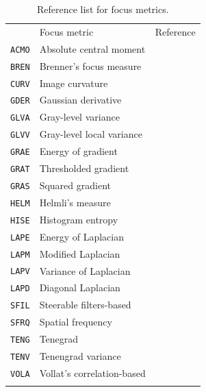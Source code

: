 \begin{table}[!tbh]
    \centering
    \caption{Reference list for focus metrics.}
    \label{tab:A.1_focus_measures}
    \begin{tabular}{@{}llr@{}}
    \toprule
    & Focus metric & Reference \\
    \arrayrulecolor{black!30}\midrule
    \texttt{ACMO} & Absolute central moment & \cite{shirvaikar2004optimal} \\
    \texttt{BREN} & Brenner's focus measure & \cite{santos1997evaluation} \\
    \texttt{CURV} & Image curvature & \cite{helmli2001adaptive} \\
    \texttt{GDER} & Gaussian derivative & \cite{geusebroek2000robust} \\
    \texttt{GLVA} & Gray-level variance & \cite{krotkov1986range} \\
    \texttt{GLVV} & Gray-level local variance & \cite{pech2000diatom} \\
    \texttt{GRAE} & Energy of gradient & \cite{subbarao1992focusing} \\
    \texttt{GRAT} & Thresholded gradient & \cite{santos1997evaluation} \\
    \texttt{GRAS} & Squared gradient & \cite{eskicioglu1995image} \\
    \texttt{HELM} & Helmli's measure & \cite{helmli2001adaptive} \\
    \texttt{HISE} & Histogram entropy & \cite{krotkov1986range} \\
    \texttt{LAPE} & Energy of Laplacian & \cite{subbarao1992focusing} \\
    \texttt{LAPM} & Modified Laplacian & \cite{nayar1990shape} \\
    \texttt{LAPV} & Variance of Laplacian & \cite{pech2000diatom} \\
    \texttt{LAPD} & Diagonal Laplacian & \cite{thelen2008improvements}  \\
    \texttt{SFIL} & Steerable filters-based & \cite{minhas20093d} \\
    \texttt{SFRQ} & Spatial frequency & \cite{eskicioglu1995image} \\
    \texttt{TENG} & Tenegrad & \cite{krotkov1986range} \\
    \texttt{TENV} & Tenengrad variance & \cite{pech2000diatom} \\
    \texttt{VOLA} & Vollat's correlation-based & \cite{santos1997evaluation} \\
    \arrayrulecolor{black}\bottomrule
    \end{tabular}
\end{table}


